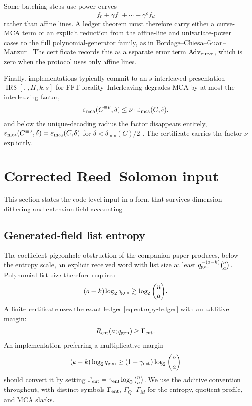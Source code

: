 \documentclass[11pt]{article}
\theoremstyle{definition}
\newcommand{\F}{\mathbb F}
\newcommand{\IRS}{\operatorname{IRS}}
\newcommand{\mca}{\varepsilon_{\rm mca}}
\newcommand{\qgen}{q_{\rm gen}}
\newcommand{\Adv}{\operatorname{Adv}}
\newcommand{\entres}{R_{\rm ent}}
\newcommand{\Int}[2]{#1^{\equiv #2}}
\begin{document}
Some batching steps use power curves
\[
        f_0+\gamma f_1+\cdots+\gamma^d f_d
\]
rather than affine lines.  A ledger theorem must therefore carry either a curve-MCA term or an explicit reduction from the affine-line and univariate-power cases to the full polynomial-generator family, as in Bordage--Chiesa--Guan--Manzur \cite{BCGM25}.  The certificate records this as a separate error term $\Adv_{\rm curve}$, which is zero when the protocol uses only affine lines.

Finally, implementations typically commit to an $s$-interleaved presentation $\IRS[\F,H,k,s]$ for FFT locality.  Interleaving degrades MCA by at most the interleaving factor,
\begin{equation}
\label{eq:interleaved-mca}
        \mca(\Int{C}{\nu},\delta)\le\nu\cdot\mca(C,\delta),
\end{equation}
and below the unique-decoding radius the factor disappears entirely, $\mca(\Int{C}{\nu},\delta)=\mca(C,\delta)$ for $\delta<\delta_{\min}(C)/2$ \cite{ABF26,DG24}.  The certificate carries the factor $\nu$ explicitly.

\section{Corrected Reed--Solomon input}
\label{sec:input}

This section states the code-level input in a form that survives dimension dithering and extension-field accounting.

\subsection{Generated-field list entropy}
\label{sec:entropy}

The coefficient-pigeonhole obstruction of the companion paper produces, below the entropy scale, an explicit received word with list size at least $\qgen^{-(a-k)}\binom na$.  Polynomial list size therefore requires
\begin{equation}
\label{eq:entropy-necessary}
        (a-k)\log_2\qgen
        \gtrsim \log_2\binom n a .
\end{equation}
A finite certificate uses the exact ledger \eqref{eq:entropy-ledger} with an additive margin:
\begin{equation}
\label{eq:entropy-margin}
        \entres(a;\qgen)\ge \Gamma_{\rm ent}.
\end{equation}
An implementation preferring a multiplicative margin
\[
        (a-k)\log_2\qgen
        \ge (1+\gamma_{\rm ent})\log_2\binom n a
\]
should convert it by setting $\Gamma_{\rm ent}=\gamma_{\rm ent}\log_2\binom na$.  We use the additive convention throughout, with distinct symbols $\Gamma_{\rm ent}$, $\Gamma_Q$, $\Gamma_M$ for the entropy, quotient-profile, and MCA slacks.
\end{document}
